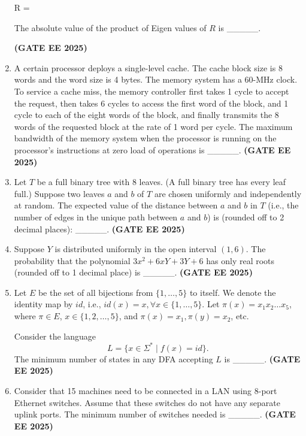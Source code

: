 \documentclass[journal,12pt,onecolumn]{IEEEtran}
\theoremstyle{remark}
\begin{document}
\begin{enumerate}
R =


The absolute value of the product of Eigen values of $R$ is \_\_\_\_\_.

\hfill \textbf{(GATE EE 2025)}

\item  A certain processor deploys a single-level cache. The cache block size is 8 words and the word size is 4 bytes. The memory system has a 60-MHz clock. To service a cache miss, the memory controller first takes 1 cycle to accept the request, then takes 6 cycles to access the first word of the block, and 1 cycle to each of the eight words of the block, and finally transmits the 8 words of the requested block at the rate of 1 word per cycle. The maximum bandwidth of the memory system when the processor is running on the processor's instructions at zero load of operations is \_\_\_\_\_. \hfill \textbf{(GATE EE 2025)}

\item Let $T$ be a full binary tree with 8 leaves. (A full binary tree has every leaf full.) Suppose two leaves $a$ and $b$ of $T$ are chosen uniformly and independently at random. The expected value of the distance between $a$ and $b$ in $T$ (i.e., the number of edges in the unique path between $a$ and $b$) is (rounded off to 2 decimal places): \_\_\_\_\_. \hfill \textbf{(GATE EE 2025)}



\item Suppose $Y$ is distributed uniformly in the open interval $(1,6)$.  
The probability that the polynomial $3x^2 + 6xY + 3Y + 6$ has only real roots (rounded off to 1 decimal place) is \_\_\_\_\_. \hfill \textbf{(GATE EE 2025)}



\item Let $E$ be the set of all bijections from $\{1, \dots, 5\}$ to itself.  
We denote the identity map by $id$, i.e., $id(x) = x, \forall x \in \{1,\dots,5\}$.  
Let $\pi(x) = x_1 x_2 \dots x_5$, where $\pi \in E$, $x \in \{1,2,\dots,5\}$, and $\pi(x) = x_1, \pi(y) = x_2$, etc.  

Consider the language
\[
L = \{ x \in \Sigma^* \mid f(x) = id \}.
\]
The minimum number of states in any DFA accepting $L$ is \_\_\_\_\_. \hfill \textbf{(GATE EE 2025)}

\item  Consider that 15 machines need to be connected in a LAN using 8-port Ethernet switches. Assume that these switches do not have any separate uplink ports. The minimum number of switches needed is \_\_\_\_\_.
\hfill \textbf{(GATE EE 2025)}



\end{enumerate}
\end{document}
